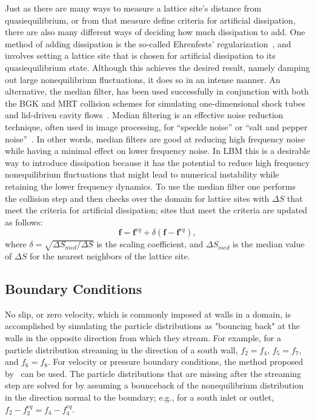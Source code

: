 \documentclass[pdftex,ms]{pittetd}
\begin{document}
Just as there are many ways to measure a lattice site's distance from quasiequilibrium, or from that measure define criteria for artificial dissipation, there are also many different ways of deciding how much dissipation to add.
One method of adding dissipation is the so-called Ehrenfests' regularization~\cite{brownlee2006stabilization}, and involves setting a lattice site that is chosen for artificial dissipation to its quasiequilibrium state.
Although this achieves the desired result, namely damping out large nonequilibrium fluctuations, it does so in an intense manner.
An alternative, the median filter, has been used successfully in conjunction with both the BGK and MRT collision schemes for simulating one-dimensional shock tubes and lid-driven cavity flows~\cite{brownlee2008nonequilibrium,gorban2014enhancement,packwood2009entropy}.
Median filtering is an effective noise reduction technique, often used in image processing, for ``speckle noise'' or ``salt and pepper noise''~\cite{brownlee2008nonequilibrium}.
In other words, median filters are good at reducing high frequency noise while having a minimal effect on lower frequency noise.
In LBM this is a desirable way to introduce dissipation because it has the potential to reduce high frequency nonequilibrium fluctuations that might lead to numerical instability while retaining the lower frequency dynamics.
To use the median filter one performs the collision step and then checks over the domain for lattice sites with $\Delta S$ that meet the criteria for artificial dissipation; sites that meet the criteria are updated as follows:
\begin{equation} \label{eq:median-filter}
\mathbf{f} = \mathbf{f}^{eq} + \delta (\mathbf{f} - \mathbf{f}^{eq}),
\end{equation}
\noindent where $\delta = \sqrt{\Delta S_{med} / \Delta S}$ is the scaling coefficient, and $\Delta S_{med}$ is the median value of $\Delta S$ for the nearest neighbors of the lattice site.


\subsection{Boundary Conditions}

No slip, or zero velocity, which is commonly imposed at walls in a domain, is accomplished by simulating the particle distributions as "bouncing back" at the walls in the opposite direction from which they stream.
For example, for a particle distribution streaming in the direction of a south wall, $f_2 = f_4$, $f_5 = f_7$, and $f_6 = f_8$.
For velocity or pressure boundary conditions, the method proposed by~\citet{zou1997pressure} can be used.
The particle distributions that are missing after the streaming step are solved for by assuming a bounceback of the nonequilibrium distribution in the direction normal to the boundary; e.g., for a south inlet or outlet, $f_2 - f_2^{eq} = f_4 - f_4^{eq}$.
\end{document}
